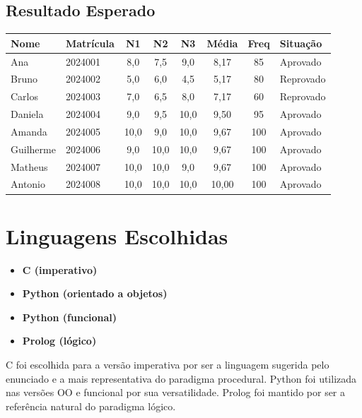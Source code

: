 \documentclass[12pt, a4paper]{article}
\begin{document}
\subsection{Resultado Esperado}

\begin{table}[h]
\centering
\begin{tabular}{llcccccl}
\toprule
\textbf{Nome} & \textbf{Matrícula} & \textbf{N1} & \textbf{N2} & \textbf{N3} & \textbf{Média} & \textbf{Freq} & \textbf{Situação} \\
\midrule
Ana       & 2024001 & 8,0  & 7,5  & 9,0  & 8,17 & 85  & Aprovado \\
Bruno     & 2024002 & 5,0  & 6,0  & 4,5  & 5,17 & 80  & Reprovado \\
Carlos    & 2024003 & 7,0  & 6,5  & 8,0  & 7,17 & 60  & Reprovado \\
Daniela   & 2024004 & 9,0  & 9,5  & 10,0 & 9,50 & 95  & Aprovado \\
Amanda    & 2024005 & 10,0 & 9,0  & 10,0 & 9,67 & 100 & Aprovado \\
Guilherme & 2024006 & 9,0  & 10,0 & 10,0 & 9,67 & 100 & Aprovado \\
Matheus   & 2024007 & 10,0 & 10,0 & 9,0  & 9,67 & 100 & Aprovado \\
Antonio   & 2024008 & 10,0 & 10,0 & 10,0 & 10,00 & 100 & Aprovado \\
\bottomrule
\end{tabular}
\end{table}

\section{Linguagens Escolhidas}

\begin{itemize}
    \item \textbf{C (imperativo)}
    \item \textbf{Python (orientado a objetos)}
    \item \textbf{Python (funcional)}
    \item \textbf{Prolog (lógico)}
\end{itemize}

C foi escolhida para a versão imperativa por ser a linguagem sugerida pelo enunciado e a mais representativa do paradigma procedural. Python foi utilizada nas versões OO e funcional por sua versatilidade. Prolog foi mantido por ser a referência natural do paradigma lógico.
\end{document}
